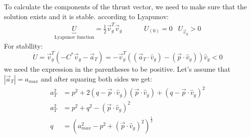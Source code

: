 \documentclass[11pt, a4paper]{article}
\begin{document}
\noindent To calculate the components of the thrust vector, we need to make sure that the solution exists and it is stable. according to Lyapunov:
\begin{equation}
    \begin{array}{ccc}
        \underbrace{U}_\text{Lyapunov function} = \frac{1}{2}\vec{v}_g^T\vec{v}_g \hspace{1cm} & U_{(0)}=0 & U_{\vec{v}_g}>0
    \end{array}
\end{equation}
For stabllity:
\begin{equation}
    \dot{U}=\vec{v}_g^T\left(-C^*\vec{v}_g-\vec{a}_T\right) = -\vec{v}_g^T\left(\left(\vec{a}_T\cdot\hat{v}_g\right)-\left(\vec{p}\cdot\hat{v}_g\right)\right)\hat{v}_g < 0
\end{equation}
we need the expression in the parentheses to be positive. Let's assume that $|\vec{a}_T|=a_{max}$ and after squaring both sides we get:
\begin{align}
    a_T^2&=p^2+2\left(q-\vec{p}\cdot\hat{v}_g\right)\left(\vec{p}\cdot\hat{v}_g\right)+\left(q-\vec{p}\cdot\hat{v}_g\right)^2 \\
    a_T^2&=p^2+q^2-\left(\vec{p}\cdot\hat{v}_g\right)^2 \\
    q&=\left(a_{max}^2-p^2+\left(\vec{p}\cdot\hat{v}_g\right)^2\right)^{\frac{1}{2}}
\end{align}
\end{document}
